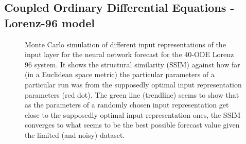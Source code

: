 \documentclass[journal]{IEEEtran}
\begin{document}
\subsection{Coupled Ordinary Differential Equations - Lorenz-96 model}

\begin{figure}[!htb]
\centering
{}
\caption{Monte Carlo simulation of different  input representations of the input layer for the neural network forecast for the 40-ODE Lorenz 96 system.
It shows the structural similarity (SSIM) against how far (in a Euclidean space metric) the particular parameters of a particular
run was from the supposedly optimal input representation parameters (red dot). The green line (trendline) seems to show that as the parameters
of a randomly chosen input representation get close to the supposedly optimal input representation ones, the SSIM converges to what seems to be the
best possible forecast value given the limited (and noisy) dataset.}
\label{MonteCarloSSIMversusParameterMetricDistanceLorenz96}
\end{figure}

\end{document}
